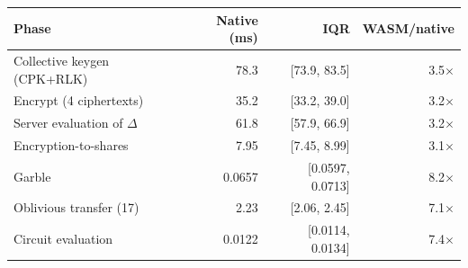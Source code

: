 \begin{tabular}{lrrr}
\hline
Phase & Native (ms) & IQR & WASM/native \\
\hline
Collective keygen (CPK+RLK) & 78.3 & [73.9, 83.5] & 3.5$\times$ \\
Encrypt (4 ciphertexts) & 35.2 & [33.2, 39.0] & 3.2$\times$ \\
Server evaluation of $\Delta$ & 61.8 & [57.9, 66.9] & 3.2$\times$ \\
Encryption-to-shares & 7.95 & [7.45, 8.99] & 3.1$\times$ \\
Garble & 0.0657 & [0.0597, 0.0713] & 8.2$\times$ \\
Oblivious transfer (17) & 2.23 & [2.06, 2.45] & 7.1$\times$ \\
Circuit evaluation & 0.0122 & [0.0114, 0.0134] & 7.4$\times$ \\
\hline
\end{tabular}
